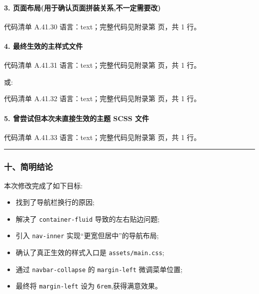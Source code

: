 \documentclass[lang=cn,scheme=chinese,color=blue,device=normal,toc=onecol,math=cm]{elegantbook}
\begin{document}
\paragraph{3. 页面布局(用于确认页面拼装关系,不一定需要改)}


\begin{codeindexbox}{代码清单 A.41.30}
语言：text；完整代码见附录第 \pageref{code:41:30} 页，共 1 行。
\end{codeindexbox}


\paragraph{4. 最终生效的主样式文件}


\begin{codeindexbox}{代码清单 A.41.31}
语言：text；完整代码见附录第 \pageref{code:41:31} 页，共 1 行。
\end{codeindexbox}


或:\par


\begin{codeindexbox}{代码清单 A.41.32}
语言：text；完整代码见附录第 \pageref{code:41:32} 页，共 1 行。
\end{codeindexbox}


\paragraph{5. 曾尝试但本次未直接生效的主题 SCSS 文件}


\begin{codeindexbox}{代码清单 A.41.33}
语言：text；完整代码见附录第 \pageref{code:41:33} 页，共 1 行。
\end{codeindexbox}


\medskip\hrule\medskip


\subsubsection{十、简明结论}


本次修改完成了如下目标:\par


\begin{itemize}
\item 找到了导航栏换行的原因;
\item 解决了 \texttt{container-fluid} 导致的左右贴边问题;
\item 引入 \texttt{nav-inner} 实现“更宽但居中”的导航布局;
\item 确认了真正生效的样式入口是 \texttt{assets/\allowbreak{}main.css};
\item 通过 \texttt{navbar-collapse} 的 \texttt{margin-left} 微调菜单位置;
\item 最终将 \texttt{margin-left} 设为 \texttt{6rem},获得满意效果。
\end{itemize}
\end{document}
